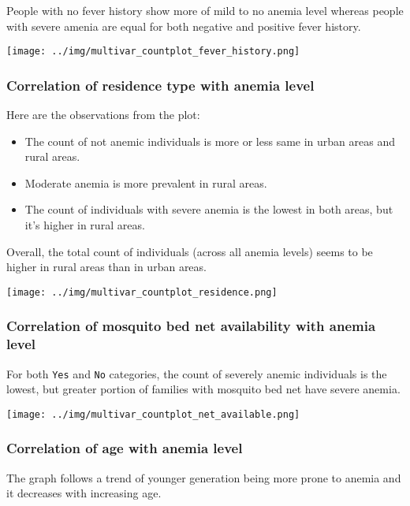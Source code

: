 People with no fever history show more of mild to no anemia level whereas people with severe amenia are equal for both negative and positive fever history.

\texttt{[image: ../img/multivar\_countplot\_fever\_history.png]}

\subsubsection{Correlation of residence type with anemia level}


Here are the observations from the plot:

\begin{itemize}
    \item The count of not anemic individuals is more or less same in urban areas and rural areas.
    \item Moderate anemia is more prevalent in rural areas.
    \item The count of individuals with severe anemia is the lowest in both areas, but it's higher in rural areas.
\end{itemize}

Overall, the total count of individuals (across all anemia levels) seems to be higher in rural areas than in urban areas.

\texttt{[image: ../img/multivar\_countplot\_residence.png]}


\subsubsection{Correlation of mosquito bed net availability with anemia level}

For both \texttt{Yes} and \texttt{No} categories, the count of severely anemic individuals is the lowest, but greater portion of families with mosquito bed net have severe anemia.

\texttt{[image: ../img/multivar\_countplot\_net\_available.png]}

\subsubsection{Correlation of age with anemia level}

The graph follows a trend of younger generation being more prone to anemia and it decreases with increasing age.

